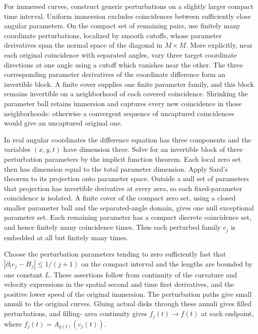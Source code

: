For immersed curves, construct generic perturbations on a slightly larger
compact time interval.  Uniform immersion excludes coincidences between
sufficiently close angular parameters.  On the compact set of remaining
pairs, use finitely many coordinate perturbations, localized by smooth
cutoffs, whose parameter derivatives span the normal space of the diagonal
in $M\times M$.  More explicitly, near each original coincidence
with separated angles, vary three target coordinate directions
at one angle using a cutoff which vanishes near the other.
The three corresponding parameter derivatives of the coordinate
difference form an invertible block.  A finite cover supplies
one finite parameter family, and this block remains invertible
on a neighborhood of each covered coincidence.  Shrinking the
parameter ball retains immersion and captures every new
coincidence in those neighborhoods: otherwise a convergent
sequence of uncaptured coincidences would give an uncaptured
original one.

In real angular coordinates the difference equation has three
components and the variables $(x,y,t)$ have dimension three.
Solve for an invertible block of three perturbation parameters
by the implicit function theorem.  Each local zero set then
has dimension equal to the total parameter dimension.  Apply
Sard's theorem to its projection onto parameter space.
Outside a null set of parameters that projection has invertible
derivative at every zero, so each fixed-parameter coincidence
is isolated.  A finite cover of the compact zero set, using
a closed smaller parameter ball and the separated-angle
domain, gives one null exceptional parameter set.  Each
remaining parameter has a compact discrete coincidence set,
and hence finitely many coincidence times.
Thus each perturbed family $c_j$ is embedded at all but finitely many times.

Choose the perturbation parameters tending to zero sufficiently fast that
$|\partial_tc_j-H_j|\le1/(j+1)$ on the compact interval and the lengths
are bounded by one constant $L$.  These assertions follow from continuity
of the curvature and velocity expressions in the spatial second and time
first derivatives, and the positive lower speed of the original immersion.
The perturbation paths give small annuli to the original curves.  Gluing
actual disks through these annuli gives filled perturbations, and filling-
area continuity gives $f_j(t)\to f(t)$ at each endpoint, where
$f_j(t)=A_{g(t)}(c_j(t))$.

